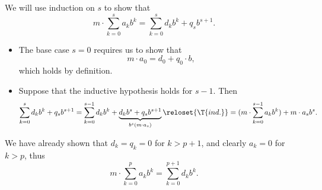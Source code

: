 \begin{defproof}

  We will use induction on \( s \) to show that
  \begin{equation*}
    m \cdot \sum_{k=0}^s a_k b^k = \sum_{k=0}^s d_k b^k + q_s b^{s+1}.
  \end{equation*}

  \begin{itemize}
    \item The base case \( s = 0 \) requires us to show that
    \begin{equation*}
      m \cdot a_0 = d_0 + q_0 \cdot b,
    \end{equation*}
    which holds by definition.

    \item Suppose that the inductive hypothesis holds for \( s - 1 \). Then
    \begin{equation*}
      \sum_{k=0}^s d_k b^k + q_s b^{s+1}
      =
      \sum_{k=0}^{s-1} d_k b^k + \underbrace{d_k b^s + q_s b^{s+1}}_{b^s(m \cdot a_s)}
      \reloset{\T{ind.}} =
      (m \cdot \sum_{k=0}^{s-1} a_k b^k) + m \cdot a_s b^s.
    \end{equation*}
  \end{itemize}

  We have already shown that \( d_k = q_k = 0 \) for \( k > p + 1 \), and clearly \( a_k = 0 \) for \( k > p \), thus
  \begin{equation*}
    m \cdot \sum_{k=0}^p a_k b^k = \sum_{k=0}^{p + 1} d_k b^k.
  \end{equation*}
\end{defproof}

